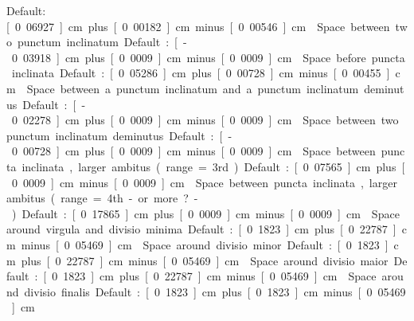 Default: \unit[0.06927]{cm} plus \unit[0.00182]{cm} minus \unit[0.00546]{cm}

Space between two punctum inclinatum.  

Default: \unit[-0.03918]{cm} plus \unit[0.0009]{cm} minus \unit[0.0009]{cm}

Space before puncta inclinata.  

Default: \unit[0.05286]{cm} plus \unit[0.00728]{cm} minus \unit[0.00455]{cm}

Space between a punctum inclinatum and a punctum inclinatum deminutus.  

Default: \unit[-0.02278]{cm} plus \unit[0.0009]{cm} minus \unit[0.0009]{cm}

Space between two punctum inclinatum deminutus.  

Default: \unit[-0.00728]{cm} plus \unit[0.0009]{cm} minus \unit[0.0009]{cm}

Space between puncta inclinata, larger ambitus (range=3rd).  

Default: \unit[0.07565]{cm} plus \unit[0.0009]{cm} minus \unit[0.0009]{cm}

Space between puncta inclinata, larger ambitus (range=4th -or more?-).  

Default: \unit[0.17865]{cm} plus \unit[0.0009]{cm} minus \unit[0.0009]{cm}

Space around virgula and divisio minima.  

Default: \unit[0.1823]{cm} plus \unit[0.22787]{cm} minus \unit[0.05469]{cm}

Space around divisio minor.  

Default: \unit[0.1823]{cm} plus \unit[0.22787]{cm} minus \unit[0.05469]{cm}

Space around divisio maior.  

Default: \unit[0.1823]{cm} plus \unit[0.22787]{cm} minus \unit[0.05469]{cm}

Space around divisio finalis.  

Default: \unit[0.1823]{cm} plus \unit[0.1823]{cm} minus \unit[0.05469]{cm}

